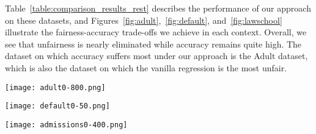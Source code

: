 Table~\ref{table:comparison_results_rest} describes the performance of our approach on these datasets, and Figures~\ref{fig:adult},~\ref{fig:default}, and~\ref{fig:lawschool} illustrate the fairness-accuracy trade-offs we achieve in each context. Overall, we see that unfairness is nearly eliminated while accuracy remains quite high. The dataset on which accuracy suffers most under our approach is the Adult dataset, which is also the dataset on which the vanilla regression is the most unfair.


\begin{figure*}[]
  \texttt{[image: adult0-800.png]}
  \caption{Adult Dataset. Fairness-Accuracy tradeoffs, as in Figure~\ref{fig:compas}.}
  \label{fig:adult}  
\end{figure*}



\begin{figure*}[]
  \texttt{[image: default0-50.png]}
  \caption{Loan Default Dataset. Fairness-Accuracy tradeoffs, as in Figure~\ref{fig:compas}.}
  \label{fig:default}
\end{figure*}



\begin{figure*}[]
  \texttt{[image: admissions0-400.png]}
  \caption{Admissions Dataset. Fairness-Accuracy tradeoffs, as in Figure~\ref{fig:compas}.}
  \label{fig:lawschool}
\end{figure*}


